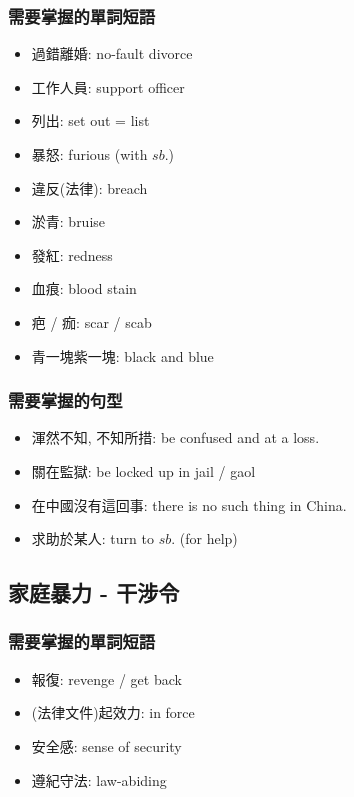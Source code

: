 \subsubsection*{需要掌握的單詞短語}
\begin{multicols}{2}
\begin{itemize}
  \itemsep0em
  \item 過錯離婚: no-fault divorce
  \item 工作人員: support officer
  \item 列出: set out = list
  \item 暴怒: furious (with $sb.$)
  \item 違反(法律): breach
  \item 淤青: bruise
  \item 發紅: redness
  \item 血痕: blood stain
  \item 疤 / 痂: scar / scab
  \item 青一塊紫一塊: black and blue
\end{itemize}
\end{multicols}

\subsubsection*{需要掌握的句型}
\begin{multicols}{2}
\begin{itemize}
  \itemsep0em
  \item 渾然不知, 不知所措: be confused and at a loss.
  \item 關在監獄: be locked up in jail / gaol
  \item 在中國沒有這回事: there is no such thing in China.
  \item 求助於某人: turn to $sb.$ (for help)
\end{itemize}
\end{multicols}

\subsection{家庭暴力 - 干涉令}
\subsubsection*{需要掌握的單詞短語}
\begin{multicols}{2}
\begin{itemize}
  \itemsep0em
  \item 報復: revenge / get back 
  \item (法律文件)起效力: in force
  \item 安全感: sense of security
  \item 遵紀守法: law-abiding
\end{itemize}
\end{multicols}

